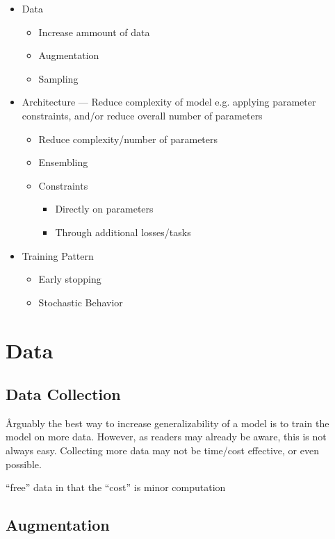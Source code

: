 \begin{itemize}[noitemsep,topsep=0pt]
	\item Data
	\begin{itemize}[noitemsep,topsep=0pt]
		\item Increase ammount of data
		\item Augmentation
		\item Sampling
	\end{itemize}
	\item Architecture --- Reduce complexity of model e.g. applying parameter constraints, and/or reduce overall number of parameters
	\begin{itemize}[noitemsep,topsep=0pt]
		\item Reduce complexity/number of parameters
		\item Ensembling
		\item Constraints
		\begin{itemize}[noitemsep,topsep=0pt]
			\item Directly on parameters
			\item Through additional losses/tasks
		\end{itemize}
	\end{itemize}
	\item Training Pattern
	\begin{itemize}[noitemsep,topsep=0pt]
		\item Early stopping
		\item Stochastic Behavior
	\end{itemize}
\end{itemize}


\section{Data}

\subsection{Data Collection}

\r{Arguably the best way to increase generalizability of a model is to train the model on more data. However, as readers may already be aware, this is not always easy. Collecting more data may not be time/cost effective, or even possible.}

\r{``free'' data in that the ``cost'' is minor computation}

\subsection{Augmentation}

